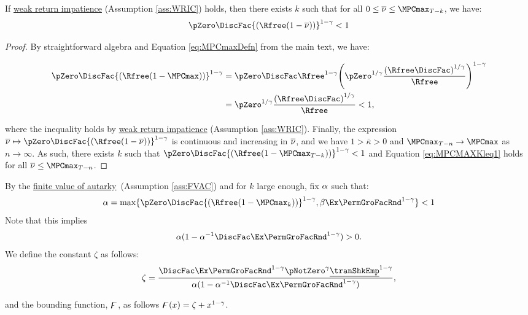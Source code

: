 \documentclass[\econtexRoot/BufferStockTheory]{subfiles}
\begin{document}
\begin{claim}\label{claim:MPCMAXKleq1}
If \hyperlink{WRIC}{weak return impatience} (Assumption \ref{ass:WRIC}) holds, then there exists $k$ such that for all $0\leq\MPCmaxInf\leq \MPCmax_{T-k}$, we have:
%
\begin{equation}\label{eq:MPCMAXKleq1}
  \pZero \DiscFac {(\Rfree (1-\MPCmaxInf))}^{1-\CRRA}   < 1
\end{equation}
%
\end{claim}
\begin{proof}

By straightforward algebra and Equation \eqref{eq:MPCmaxDefn} from the main text, we have:

\begin{equation}\begin{gathered}\begin{aligned}
\pZero \DiscFac {(\Rfree (1-\MPCmax))}^{1-\CRRA}  & = \pZero\DiscFac\Rfree^{1-\CRRA}{\left(\pZero^{1/\CRRA}\frac{{(\Rfree\DiscFac)}^{1/\CRRA}}{\Rfree}\right)}^{1-\CRRA} \\\notag
& = \pZero^{1/\CRRA}\frac{{(\Rfree\DiscFac)}^{1/\CRRA}}{\Rfree} <1 \notag,
\end{aligned}\end{gathered}\end{equation}

where the inequality holds by \hyperlink{WRIC}{weak return impatience} (Assumption \ref{ass:WRIC}).
Finally, the expression $\MPCmaxInf\mapsto \pZero \DiscFac {(\Rfree (1-\MPCmaxInf))}^{1-\CRRA} $ is continuous and increasing in $\overline{\nu}$, and we have $1>\bar{\kappa}>0$ and $\MPCmax_{T-n} \rightarrow \MPCmax$ as $n\rightarrow\infty$.
As such, there exists $k$ such that $\pZero \DiscFac {(\Rfree (1-\MPCmax_{T-k}))}^{1-\CRRA}<1$ and Equation \eqref{eq:MPCMAXKleq1} holds for all $\MPCmaxInf\leq \MPCmax_{T-n}$.


\end{proof}


\begin{remark}\label{rem:shnkrdef}
By the \hyperlink{FVAC}{finite value of autarky}~(Assumption \ref{ass:FVAC}) and for $k$ large enough, fix $\alpha$ such that:
%
\begin{equation}\label{eq:shnkrdef}
\Shrinker = \max\{\pZero \DiscFac {(\Rfree (1-\MPCmax_{k}))}^{1-\CRRA},\beta\Ex\PermGroFacRnd^{1-\CRRA}\}<1
\end{equation}
%
Note that this implies
%
\begin{equation}\label{eq:shrnkrCond}
\Shrinker(1- \Shrinker^{-1}\DiscFac \Ex\PermGroFacRnd^{1-\CRRA })>0. 
\end{equation}
%
We define the constant $\zeta$ as follows:
%
\begin{equation}\label{eq:Mbarddef}
\zeta = \frac{\DiscFac \Ex \PermGroFacRnd^{1-\CRRA }\pNotZero^{\CRRA}\underline{\tranShkEmp}^{1-\CRRA}}{\Shrinker(1- \Shrinker^{-1}\DiscFac \Ex \PermGroFacRnd^{1-\CRRA })}, 
\end{equation}

and the bounding function, $\digamma$, as follows $\digamma(x) = \zeta +  x^{1-\gamma}$.


\end{remark}
\end{document}
